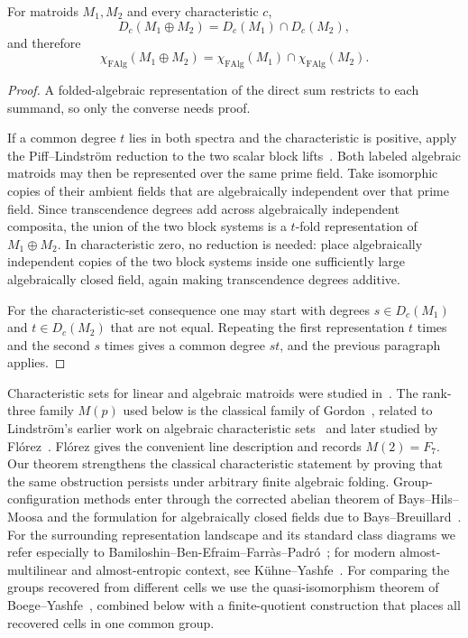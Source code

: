 \documentclass[11pt]{article}
\theoremstyle{definition}
\newcommand{\FAlg}{\mathrm{FAlg}}
\begin{document}
\begin{proposition}\label{prop:directsum}
For matroids $M_1,M_2$ and every characteristic $c$,
\[
D_c(M_1\oplus M_2)=D_c(M_1)\cap D_c(M_2),
\]
and therefore
\[
\chi_{\FAlg}(M_1\oplus M_2)=
\chi_{\FAlg}(M_1)\cap\chi_{\FAlg}(M_2).
\]
\end{proposition}
\begin{proof}
A folded-algebraic representation of the direct sum restricts to each summand, so only the converse needs proof.

If a common degree $t$ lies in both spectra and the characteristic is positive, apply the Piff--Lindstr\"om reduction to the two scalar block lifts~\cite[Theorem~2.3]{BenEfraim2016}.  Both labeled algebraic matroids may then be represented over the same prime field.  Take isomorphic copies of their ambient fields that are algebraically independent over that prime field.  Since transcendence degrees add across algebraically independent composita, the union of the two block systems is a $t$-fold representation of $M_1\oplus M_2$.  In characteristic zero, no reduction is needed: place algebraically independent copies of the two block systems inside one sufficiently large algebraically closed field, again making transcendence degrees additive.

For the characteristic-set consequence one may start with degrees $s\in D_c(M_1)$ and $t\in D_c(M_2)$ that are not equal.  Repeating the first representation $t$ times and the second $s$ times gives a common degree $st$, and the previous paragraph applies.
\end{proof}

Characteristic sets for linear and algebraic matroids were studied in~\cite{Kahn1982,Lindstrom1985,Gordon1988,CartwrightVarghese2024}.  The rank-three family $M(p)$ used below is the classical family of Gordon~\cite{Gordon1988}, related to Lindstr\"om's earlier work on algebraic characteristic sets~\cite{Lindstrom1985} and later studied by Fl\'orez~\cite{Florez2006}.  Fl\'orez gives the convenient line description and records $M(2)=F_7$.  Our theorem strengthens the classical characteristic statement by proving that the same obstruction persists under arbitrary finite algebraic folding.  Group-configuration methods enter through the corrected abelian theorem of Bays--Hils--Moosa and the formulation for algebraically closed fields due to Bays--Breuillard~\cite{BaysHilsMoosa2017,BaysBreuillard2021}.  For the surrounding representation landscape and its standard class diagrams we refer especially to Bamiloshin--Ben-Efraim--Farr\`as--Padr\'o~\cite{BamiloshinEtAl2021}; for modern almost-multilinear and almost-entropic context, see K\"uhne--Yashfe~\cite{KuhneYashfeEntropic}.  For comparing the groups recovered from different cells we use the quasi-isomorphism theorem of Boege--Yashfe~\cite{BoegeYashfe2026}, combined below with a finite-quotient construction that places all recovered cells in one common group.
\end{document}
